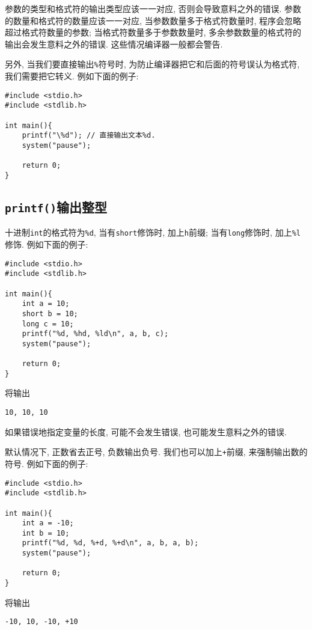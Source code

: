             参数的类型和格式符的输出类型应该一一对应, 否则会导致意料之外的错误. 参数的数量和格式符的数量应该一一对应, 当参数数量多于格式符数量时, 程序会忽略超过格式符数量的参数; 当格式符数量多于参数数量时, 多余参数数量的格式符的输出会发生意料之外的错误. 这些情况编译器一般都会警告.

            另外, 当我们要直接输出\texttt{\%}符号时, 为防止编译器把它和后面的符号误认为格式符, 我们需要把它转义. 例如下面的例子:
\begin{lstlisting}
#include <stdio.h>
#include <stdlib.h>

int main(){
    printf("\%d"); // 直接输出文本%d.
    system("pause");

    return 0;
}
\end{lstlisting}


        \subsection*{\texttt{printf()}输出整型}
            十进制\texttt{int}的格式符为\texttt{\%d}, 当有\texttt{short}修饰时, 加上\texttt{h}前缀; 当有\texttt{long}修饰时, 加上\texttt{\%l}修饰. 例如下面的例子:
\begin{lstlisting}
#include <stdio.h>
#include <stdlib.h>

int main(){
    int a = 10;
    short b = 10;
    long c = 10;
    printf("%d, %hd, %ld\n", a, b, c);
    system("pause");

    return 0;
}
\end{lstlisting}
            将输出
\begin{lstlisting}
10, 10, 10
\end{lstlisting}

            如果错误地指定变量的长度, 可能不会发生错误, 也可能发生意料之外的错误.

            默认情况下, 正数省去正号, 负数输出负号. 我们也可以加上\texttt{+}前缀, 来强制输出数的符号. 例如下面的例子:
\begin{lstlisting}
#include <stdio.h>
#include <stdlib.h>

int main(){
    int a = -10;
    int b = 10;
    printf("%d, %d, %+d, %+d\n", a, b, a, b);
    system("pause");

    return 0;
}
\end{lstlisting}
            将输出
\begin{lstlisting}
-10, 10, -10, +10
\end{lstlisting}


